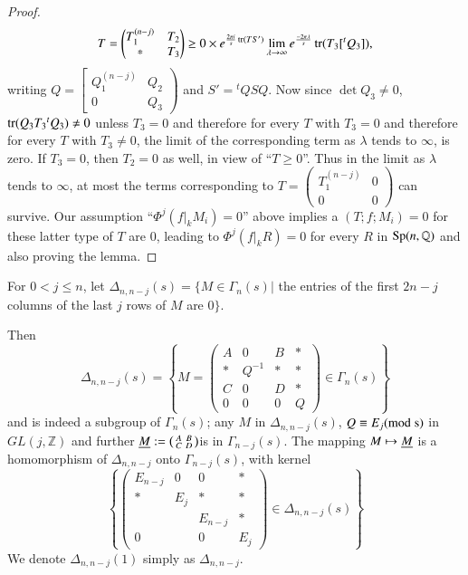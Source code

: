\begin{proof}
\begin{align*}
&\quad T=
\begin{pmatrix}
T_{1}^{(n-j)} & T_{2}\\
\ast & T_{3}
\end{pmatrix}
\geq 0\times e^{\frac{2\pi i}{s}\operatorname{tr}(TS')}\lim\limits_{\lambda\to
  \infty}e^{\frac{-2\pi \lambda}{s}}\operatorname{tr}(T_{3}[{}^{t}Q_{3}]), 
\end{align*}
writing $Q=\left[\begin{smallmatrix} Q_{1}^{(n-j)} & Q_{2}\\ 0 & Q_{3}
  \end{smallmatrix}\right)$ and $S'={}^{t}QSQ$. Now since $\det
  Q_{3}\neq 0$, $\operatorname{tr}(Q_{3}T_{3}{}^{t}Q_{3})\neq 0$ unless $T_{3}=0$
  and therefore for every $T$ with $T_{3}=0$ and therefore for every
  $T$ with $T_{3}\neq 0$, the limit of the corresponding term as
  $\lambda$ tends to $\infty$, is zero. If $T_{3}=0$, then $T_{2}=0$
  as well, in view of ``$T\geq 0$''. Thus in the limit as $\lambda$
  tends to $\infty$, at most the terms corresponding to
  $T=\left(\begin{smallmatrix} T_{1}^{(n-j)} & 0\\ 0 & 0
  \end{smallmatrix}\right)$ can survive. Our assumption
  ``$\Phi^{j}(f|_{k}M_{i})=0$'' above implies a $(T;f;M_{i})=0$ for
  these latter type of $T$ are $0$, leading to $\Phi^{j}(f|_{k}R)=0$
  for every $R$ in $\operatorname{Sp}(n,\mathbb{Q})$ and also proving the lemma.
\end{proof}

For $0< j\leq n$, let $\Delta_{n,n-j}(s)=\{M\in\Gamma_{n}(s)|$ the
entries of the first $2n-j$ columns of the last $j$ rows of $M$ are
$0\}$.

Then 
$$
\Delta_{n,n-j}(s)=
\left\{
M=
\begin{pmatrix}
A & 0 & B & \ast\\
\ast & Q^{-1} & \ast & \ast\\
C & 0 & D & \ast\\
0 & 0 & 0 & Q
\end{pmatrix}
\in\Gamma_{n}(s)
\right\}
$$
and is indeed a subgroup of $\Gamma_{n}(s)$; any $M$ in
$\Delta_{n,n-j}(s)$, $Q\equiv E_{j}(\rm{mod} \; s)$ in $GL(j,\mathbb{Z})$ and
further $\underline{M}:=\left(\begin{smallmatrix} A & B\\ C & D
\end{smallmatrix}\right)$\pageoriginale is in $\Gamma_{n-j}(s)$. The mapping
$M\mapsto \underline{M}$ is a homomorphism of $\Delta_{n,n-j}$ onto
$\Gamma_{n-j}(s)$, with kernel
$$
\left\{
\begin{pmatrix}
E_{n-j} & 0 & 0 & \ast\\
\ast & E_{j} & \ast & \ast\\
 & & E_{n-j} & \ast\\
0 & & 0 & E_{j}
\end{pmatrix}
\in \Delta_{n,n-j}(s)
\right\}
$$
We denote $\Delta_{n,n-j}(1)$ simply as $\Delta_{n,n-j}$.

